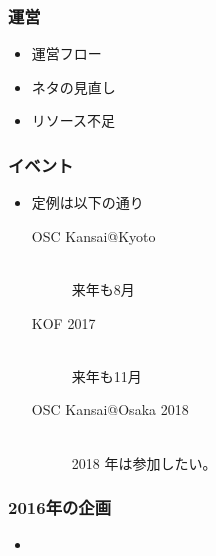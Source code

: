 \documentclass[cjk,dvipdfmx,10pt,compress,%
hyperref={bookmarks=true,bookmarksnumbered=true,bookmarksopen=false,%
colorlinks=false,%
pdftitle={第 117 回 関西 Debian 勉強会},%
pdfauthor={倉敷・のがた・佐々木・かわだ・おおつき},%
pdfsubject={資料},%
}]{beamer}
\begin{document}
\begin{frame}
  \frametitle{運営}
  \begin{itemize}
  \item 運営フロー
  \item ネタの見直し
  \item リソース不足
  \end{itemize}
\end{frame}

\begin{frame}
  \frametitle{イベント}
  \begin{itemize}
  \item 定例は以下の通り
    \begin{description}
    \item[OSC Kansai@Kyoto] \mbox{~}\\
      来年も8月
    \item[KOF 2017] \mbox{~}\\
      来年も11月
    \item[OSC Kansai@Osaka 2018] \mbox{~}\\
     2018 年は参加したい。
    \end{description}
  \end{itemize}
\end{frame}


\begin{frame}
  \frametitle{2016年の企画}
  \begin{itemize}
  \item
  \end{itemize}
\end{frame}
\end{document}
